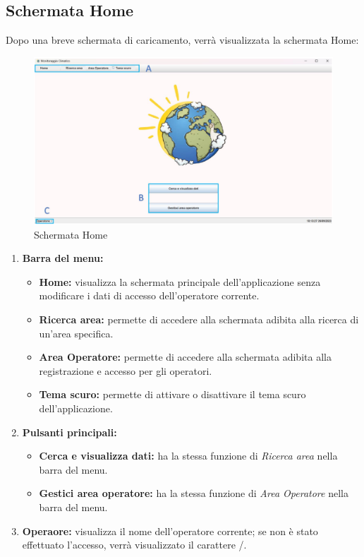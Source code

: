 \subsection{Schermata Home}
Dopo una breve schermata di caricamento, verrà visualizzata la schermata Home:
\begin{figure}[H]
    \centering
    \includegraphics[width=1\textwidth]{../../img/schermata_home.png}
    \caption{Schermata Home}
\end{figure}

\begin{enumerate}
\renewcommand{\labelenumi}{\Alph{enumi}}
    \item \textbf{Barra del menu:} 
    \begin{itemize}
        \item \textbf{Home:} visualizza la schermata principale dell'applicazione senza modificare i dati di accesso dell'operatore corrente.
        \item \textbf{Ricerca area:} permette di accedere alla schermata adibita alla ricerca di un'area specifica.
        \item \textbf{Area Operatore:} permette di accedere alla schermata adibita alla registrazione e accesso per gli operatori.
        \item \textbf{Tema scuro:} permette di attivare o disattivare il tema scuro dell'applicazione.
    \end{itemize} 
    \item \textbf{Pulsanti principali:}
    \begin{itemize}
        \item \textbf{Cerca e visualizza dati:} ha la stessa funzione di \emph{Ricerca area} nella barra del menu.
        \item \textbf{Gestici area operatore:} ha la stessa funzione di \emph{Area Operatore} nella barra del menu.
    \end{itemize}
    \item \textbf{Operaore:} visualizza il nome dell'operatore corrente; se non è stato effettuato l'accesso, verrà visualizzato il carattere /.
\end{enumerate}
